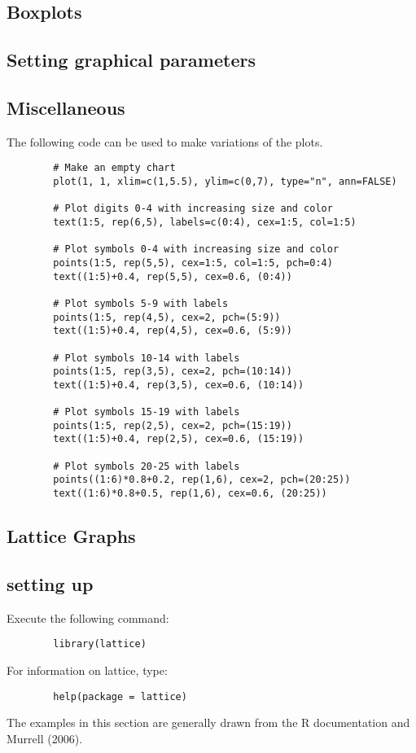 \documentclass[a4paper,12pt]{article}
\begin{document}
\begin{itemize}
	\subsection{Boxplots}
	\subsection{Setting graphical parameters}
	\subsection{Miscellaneous}
	The following code can be used to make variations of the plots.
	
	\begin{framed}
		\large \begin{verbatim}
		# Make an empty chart
		plot(1, 1, xlim=c(1,5.5), ylim=c(0,7), type="n", ann=FALSE)
		
		# Plot digits 0-4 with increasing size and color
		text(1:5, rep(6,5), labels=c(0:4), cex=1:5, col=1:5)
		
		# Plot symbols 0-4 with increasing size and color
		points(1:5, rep(5,5), cex=1:5, col=1:5, pch=0:4)
		text((1:5)+0.4, rep(5,5), cex=0.6, (0:4))
		
		# Plot symbols 5-9 with labels
		points(1:5, rep(4,5), cex=2, pch=(5:9))
		text((1:5)+0.4, rep(4,5), cex=0.6, (5:9))
		
		# Plot symbols 10-14 with labels
		points(1:5, rep(3,5), cex=2, pch=(10:14))
		text((1:5)+0.4, rep(3,5), cex=0.6, (10:14))
		
		# Plot symbols 15-19 with labels
		points(1:5, rep(2,5), cex=2, pch=(15:19))
		text((1:5)+0.4, rep(2,5), cex=0.6, (15:19))
		
		# Plot symbols 20-25 with labels
		points((1:6)*0.8+0.2, rep(1,6), cex=2, pch=(20:25))
		text((1:6)*0.8+0.5, rep(1,6), cex=0.6, (20:25))
		\end{verbatim}\large
	\end{framed}
	
	\subsection{Lattice Graphs}
	\subsection{setting up}
	Execute the following command:
	\begin{framed}
		\begin{verbatim}
		library(lattice)
		\end{verbatim}
	\end{framed}
	For information on lattice, type:
	\begin{framed}
		\begin{verbatim}
		help(package = lattice)
		\end{verbatim}
	\end{framed}
	The examples in this section are generally drawn from the R documentation and Murrell (2006).
	

\end{itemize}
\end{document}
